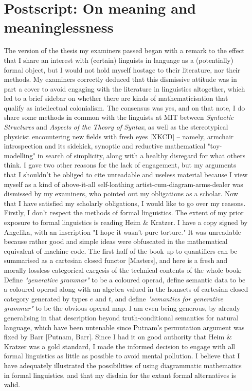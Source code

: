 \section{Postscript: On meaning and meaninglessness}

The version of the thesis my examiners passed began with a remark to the effect that I share an interest with (certain) linguists in language as a (potentially) formal object, but I would not hold myself hostage to their literature, nor their methods. My examiners correctly deduced that this dismissive attitude was in part a cover to avoid engaging with the literature in linguistics altogether, which led to a brief sidebar on whether there are kinds of mathematicisation that qualify as intellectual colonialism. The consensus was yes, and on that note, I do share some methods in common with the linguists at MIT between \emph{Syntactic Structures} and \emph{Aspects of the Theory of Syntax}, as well as the stereotypical physicist encountering new fields with fresh eyes [XKCD] -- namely, armchair introspection and its sidekick, synoptic and reductive mathematical "toy-modelling" in search of simplicity, along with a healthy disregard for what others think. I gave two other reasons for the lack of engagement, but my arguments that I shouldn't be obliged to cite unreadable and useless material because I view myself as a kind of above-it-all self-loathing artist-cum-diagram-arms-dealer was dismissed by my examiners, who pointed out my obligations as a scholar. Now that I have satisfied my scholarly obligations, I would like to go over my reasons.\\

Firstly, I don't respect the methods of formal linguistics. The extent of my prior exposure to formal linguistics is reading Heim \& Kratzer. I have a copy signed by Angelika, with an inscription "I hope it wasn't pure torture." It was unreadable because rather good and simple ideas were obfuscated in the mathematical equivalent of machine code. The first half of the book up to quantifiers can be summarised as a cartesian closed functor [Masters], and here is a fresh and morally lossless categorical exegesis of the technical contents of the whole book: Define \emph{"generative grammar"} to be a coloured operad, define semantic data to be a coloured operad along with an algebra valued in the homsets of cartesian closed category generated by types $e$ and $t$, and define \emph{"semantics for generative grammar"} to be the obvious operad map. I am even being generous, by already generalising in that description beyond truth-conditional semantics for natural language, which have been untenable since Putnam's permutation argument was fixed by Barr [Putnam, Barr]. Since I had it on good authority that Heim \& Kratzer was a gold standard, I made the informed decision to engage with all formal linguistics as little as possible to avoid mental pollution. I believe that I have adequately illustrated the possibilities of using diagrammatic mathematics in formal linguistics, and that my disdain for the extant formal alternatives is valid.\\

